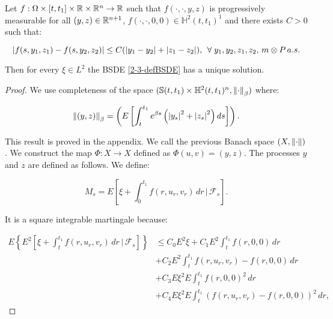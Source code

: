 \begin{theorem}
    Let $f:\Omega\times[t,t_1]\times\mathbb{R}\times\mathbb{R}^n\rightarrow \mathbb{R}$ such that $f(\cdot,\cdot,y,z)$ is progressively measurable for all 
    $(y,z)\in\mathbb{R}^{n+1}$, $f(\cdot,\cdot,0,0)\in\mathbb{H}^2(t,t_1)^1$ and there exists $C>0$ such that:

    \begin{equation}
        \abs{f(s,y_1,z_1)-f(s,y_2,z_2)} \leq C(\abs{y_1-y_2} + \abs{z_1-z_2}),\,\forall y_1,y_2,z_1,z_2,\, m\otimes P\,a.s.
    \end{equation}

    Then for every $\xi\in L^2$ the BSDE \ref{2-3-defBSDE} has a unique solution.

    \begin{proof}
        We use completeness of the space $(\mathbb{S}(t,t_1)\times\mathbb{H}^2(t,t_1)^n, \norm{\cdot}_{\beta})$ where:

        \begin{equation}
            \norm{(y,z)}_{\beta} = \left(E\left[\int_t^{t_1} e^{\beta s}\left(\abs{y_s}^2+\abs{z_s}^2\right)ds\right]\right).
        \end{equation}

        This result is proved in the appendix. We call the previous Banach space $(X,\norm{\cdot})$. We construct the map 
        $\Phi:X\rightarrow X$ defined as $\Phi(u,v)=(y,z)$. The processes $y$ and $z$ are defined as follows. We define:

        \begin{equation}
            M_s = E\left[\xi + \int_0^{t_1} f(r,u_r,v_r)\,dr\,|\,\mathcal{F}_s\right].
        \end{equation}

        It is a square integrable martingale because:
        
        \begin{align}
            E\left\{E^2\left[\xi + \int_t^{t_1} f(r,u_r,v_r)\,dr\,|\,\mathcal{F}_s\right]\right\} & 
             \leq C_0 E^2\xi + C_1E^2\int_t^{t_1} f(r,0,0)\,dr \\
            & + C_2E^2\int_t^{t_1} f(r,u_r,v_r)-f(r,0,0)\,dr \\
            & + C_3E\xi^2E\int_t^{t_1}f(r,0,0)^2\,dr \\
            & + C_4E\xi^2E\int_t^{t_1}(f(r,u_r,v_r)-f(r,0,0))^2\,dr, 
        \end{align}


\end{proof}
\end{theorem}
